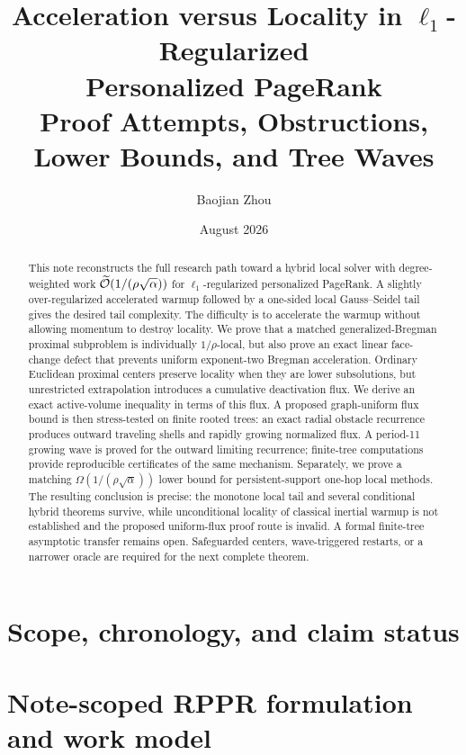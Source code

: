 \documentclass[11pt]{article}
\title{Acceleration versus Locality in $\ell_1$-Regularized\\
Personalized PageRank\\[0.3em]
\large Proof Attempts, Obstructions, Lower Bounds, and Tree Waves}
\author{Baojian Zhou}
\date{August 2026}
\begin{document}
\maketitle

\begin{abstract}
This note reconstructs the full research path toward a hybrid local solver
with degree-weighted work
$\widetilde{\mathcal{O}}(1/(\rho\sqrt{\alpha}))$ for $\ell_1$-regularized personalized
PageRank.  A slightly over-regularized accelerated warmup followed by a
one-sided local Gauss--Seidel tail gives the desired tail complexity.  The
difficulty is to accelerate the warmup without allowing momentum to destroy
locality.  We prove that a matched generalized-Bregman proximal subproblem is
individually $1/\rho$-local, but also prove an exact linear face-change defect
that prevents uniform exponent-two Bregman acceleration.  Ordinary Euclidean
proximal centers preserve locality when they are lower subsolutions, but
unrestricted extrapolation introduces a cumulative deactivation flux.  We
derive an exact active-volume inequality in terms of this flux.  A proposed
graph-uniform flux bound is then stress-tested on finite rooted trees: an
exact radial obstacle recurrence produces outward traveling shells and
rapidly growing normalized flux.  A period-11 growing wave is proved for the
outward limiting recurrence; finite-tree computations provide reproducible
certificates of the same mechanism.  Separately, we prove a matching
$\Omega(1/(\rho\sqrt{\alpha}))$ lower bound for persistent-support one-hop
local methods.  The resulting conclusion is precise: the monotone local tail
and several conditional hybrid theorems survive, while unconditional locality
of classical inertial warmup is not established and the proposed uniform-flux
proof route is invalid.  A formal finite-tree asymptotic transfer remains open.
Safeguarded centers, wave-triggered restarts, or a narrower oracle are required
for the next complete theorem.
\end{abstract}

\tableofcontents

\section{Scope, chronology, and claim status}


\section{Note-scoped RPPR formulation and work model}

\end{document}

